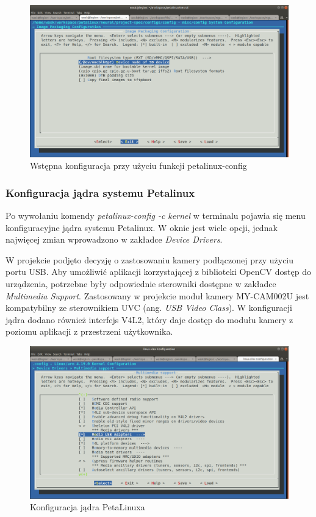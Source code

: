 \begin{figure}[!h]
  \centering
  \includegraphics[width=\textwidth]{img/petalinux-config.png}
  \caption{Wstępna konfiguracja przy użyciu funkcji petalinux-config}
  \label{petalinux-config}
\end{figure}

\subsubsection{Konfiguracja jądra systemu Petalinux}

Po wywołaniu komendy \emph{petalinux-config -c kernel} w terminalu pojawia się menu konfiguracyjne jądra systemu 
Petalinux. W oknie jest wiele opcji, jednak najwięcej zmian wprowadzono w zakładce \emph{Device Drivers}. 

W projekcie podjęto decyzję o zastosowaniu kamery podłączonej przy użyciu portu USB. Aby umożliwić aplikacji 
korzystającej z biblioteki OpenCV dostęp do urządzenia, potrzebne były odpowiednie sterowniki \cite{usb-camera} 
dostępne w zakładce \emph{Multimedia Support}. Zastosowany w projekcie moduł kamery MY-CAM002U jest kompatybilny ze 
sterownikiem UVC (ang. \emph{USB Video Class}). W konfiguracji jądra dodano również interfejs V4L2, który daje dostęp 
do modułu kamery z poziomu aplikacji z przestrzeni użytkownika.

\begin{figure}[!h]
  \centering
  \includegraphics[width=\textwidth]{img/petalinux-config-kernel.png}
  \caption{Konfiguracja jądra PetaLinuxa}
  \label{petalinux-config-kernel}
\end{figure}

